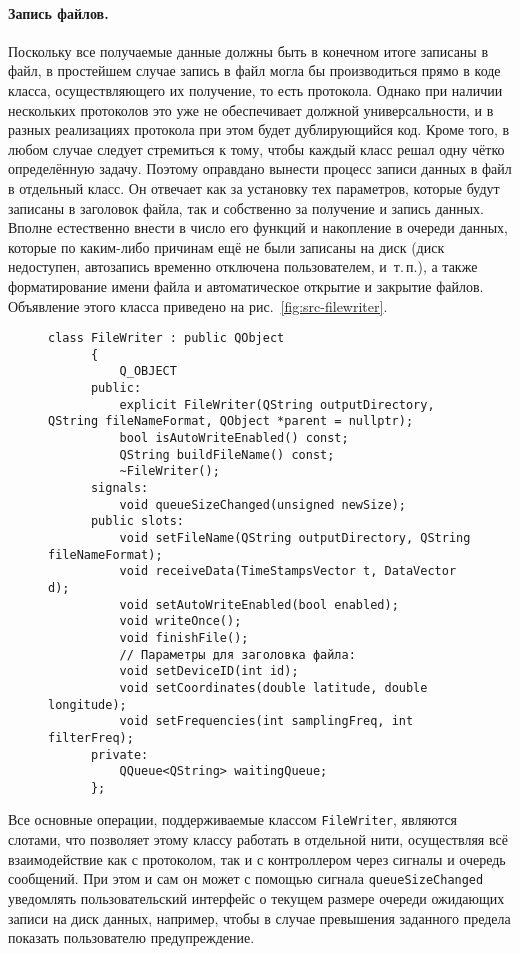 \documentclass[a4paper, 14pt, titlepage]{extarticle}
\newcommand{\inlinecode}[1]{\lstinline[basicstyle=\ttfamily]{#1}}
\newenvironment{myfigure}[2]%
    {\pushQED{\caption{#1} \label{#2}} %
     \begin{figure}[!htb]\centering } %
    {  \popQED %
     \end{figure}}
\begin{document}
  \paragraph{Запись файлов.}
  Поскольку все получаемые данные должны быть в конечном итоге записаны в файл, в простейшем случае
  запись в файл могла бы производиться прямо в коде класса, осуществляющего их получение, то есть
  протокола. Однако при наличии нескольких протоколов это уже не обеспечивает должной
  универсальности, и в разных реализациях протокола при этом будет дублирующийся код. Кроме того, в
  любом случае следует стремиться к тому, чтобы каждый класс решал одну чётко определённую задачу.
  Поэтому оправдано вынести процесс записи данных в файл в отдельный класс.
  Он отвечает как за установку тех параметров, которые будут записаны в заголовок файла, так и
  собственно за получение и запись данных. Вполне естественно внести в число его функций и
  накопление в очереди данных, которые по каким-либо причинам ещё не были записаны на диск (диск
  недоступен, автозапись временно отключена пользователем, и~т.\,п.), а также форматирование имени
  файла и автоматическое открытие и закрытие файлов. Объявление этого класса приведено на
  рис.~\ref{fig:src-filewriter}.

  \begin{myfigure}{Класс, отвечающий за запись файлов}{fig:src-filewriter}
    \begin{lstlisting}[xleftmargin=7mm, xrightmargin=7mm]
      class FileWriter : public QObject
      {
          Q_OBJECT
      public:
          explicit FileWriter(QString outputDirectory, QString fileNameFormat, QObject *parent = nullptr);
          bool isAutoWriteEnabled() const;
          QString buildFileName() const;
          ~FileWriter();
      signals:
          void queueSizeChanged(unsigned newSize);
      public slots:
          void setFileName(QString outputDirectory, QString fileNameFormat);
          void receiveData(TimeStampsVector t, DataVector d);
          void setAutoWriteEnabled(bool enabled);
          void writeOnce();
          void finishFile();
          // Параметры для заголовка файла:
          void setDeviceID(int id);
          void setCoordinates(double latitude, double longitude);
          void setFrequencies(int samplingFreq, int filterFreq);
      private:
          QQueue<QString> waitingQueue;
      };
    \end{lstlisting}
  \end{myfigure}

  Все основные операции, поддерживаемые классом \inlinecode{FileWriter}, являются слотами, что
  позволяет этому классу работать в отдельной нити, осуществляя всё взаимодействие как с
  протоколом, так и с контроллером через сигналы и очередь сообщений. При этом и сам он может с
  помощью сигнала \inlinecode{queueSizeChanged} уведомлять пользовательский интерфейс о текущем размере очереди ожидающих записи
  на диск данных, например, чтобы в случае превышения заданного предела показать пользователю предупреждение.
\end{document}
